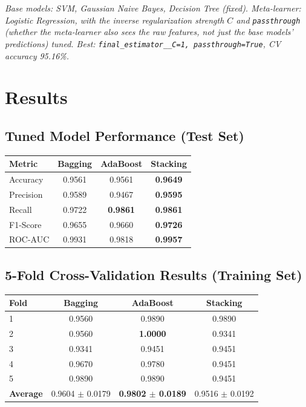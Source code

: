 \documentclass[12pt,a4paper]{article}
\begin{document}
\textit{Base models: SVM, Gaussian Naive Bayes, Decision Tree (fixed). Meta-learner: Logistic
Regression, with the inverse regularization strength $C$ and \texttt{passthrough}
(whether the meta-learner also sees the raw features, not just the base models' predictions)
tuned. Best: \texttt{final\_estimator\_\_C=1, passthrough=True}, CV accuracy 95.16\%.}

\section{Results}

\subsection*{Tuned Model Performance (Test Set)}
\begin{tabular}{lccc}
\toprule
Metric & Bagging & AdaBoost & Stacking \\
\midrule
Accuracy  & 0.9561 & 0.9561 & \textbf{0.9649} \\
Precision & 0.9589 & 0.9467 & \textbf{0.9595} \\
Recall    & 0.9722 & \textbf{0.9861} & \textbf{0.9861} \\
F1-Score  & 0.9655 & 0.9660 & \textbf{0.9726} \\
ROC-AUC   & 0.9931 & 0.9818 & \textbf{0.9957} \\
\bottomrule
\end{tabular}

\subsection*{5-Fold Cross-Validation Results (Training Set)}
\begin{tabular}{lccc}
\toprule
Fold & Bagging & AdaBoost & Stacking \\
\midrule
1 & 0.9560 & 0.9890 & 0.9890 \\
2 & 0.9560 & \textbf{1.0000} & 0.9341 \\
3 & 0.9341 & 0.9451 & 0.9451 \\
4 & 0.9670 & 0.9780 & 0.9451 \\
5 & 0.9890 & 0.9890 & 0.9451 \\
\midrule
\textbf{Average} & 0.9604 $\pm$ 0.0179 & \textbf{0.9802 $\pm$ 0.0189} & 0.9516 $\pm$ 0.0192 \\
\bottomrule
\end{tabular}
\vspace{2mm}
\end{document}
